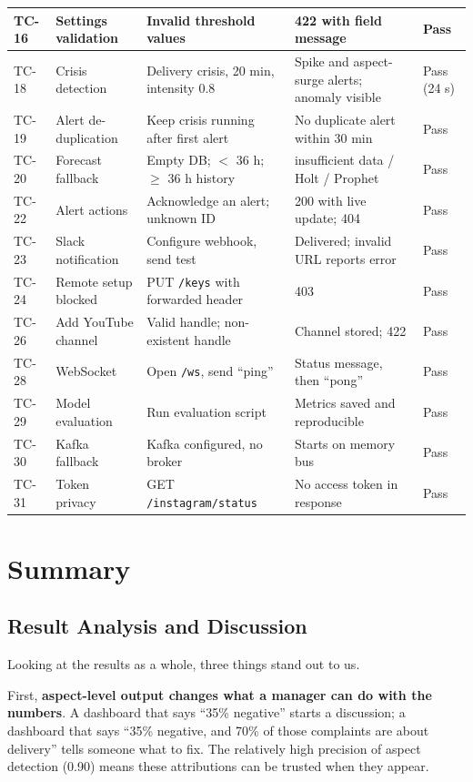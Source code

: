 \documentclass[12pt,a4paper]{report}
\begin{document}
\begin{longtable}{|P{1.2cm}|P{3.6cm}|P{3.4cm}|P{3.6cm}|P{1.6cm}|}
TC-16 & Settings validation & Invalid threshold values & 422 with field message & Pass \\ \hline
TC-18 & Crisis detection & Delivery crisis, 20 min, intensity 0.8 & Spike and aspect-surge alerts; anomaly visible & Pass (24 s) \\ \hline
TC-19 & Alert de-duplication & Keep crisis running after first alert & No duplicate alert within 30 min & Pass \\ \hline
TC-20 & Forecast fallback & Empty DB; $<$ 36 h; $\geq$ 36 h history & insufficient data / Holt / Prophet & Pass \\ \hline
TC-22 & Alert actions & Acknowledge an alert; unknown ID & 200 with live update; 404 & Pass \\ \hline
TC-23 & Slack notification & Configure webhook, send test & Delivered; invalid URL reports error & Pass \\ \hline
TC-24 & Remote setup blocked & PUT \texttt{/keys} with forwarded header & 403 & Pass \\ \hline
TC-26 & Add YouTube channel & Valid handle; non-existent handle & Channel stored; 422 & Pass \\ \hline
TC-28 & WebSocket & Open \texttt{/ws}, send ``ping'' & Status message, then ``pong'' & Pass \\ \hline
TC-29 & Model evaluation & Run evaluation script & Metrics saved and reproducible & Pass \\ \hline
TC-30 & Kafka fallback & Kafka configured, no broker & Starts on memory bus & Pass \\ \hline
TC-31 & Token privacy & GET \texttt{/instagram/status} & No access token in response & Pass \\ \hline
\end{longtable}

\section{Summary}

\subsection{Result Analysis and Discussion}

Looking at the results as a whole, three things stand out to us.

First, \textbf{aspect-level output changes what a manager can do with the numbers}. A dashboard that says ``35\% negative'' starts a discussion; a dashboard that says ``35\% negative, and 70\% of those complaints are about delivery'' tells someone what to fix. The relatively high precision of aspect detection (0.90) means these attributions can be trusted when they appear.
\end{document}
